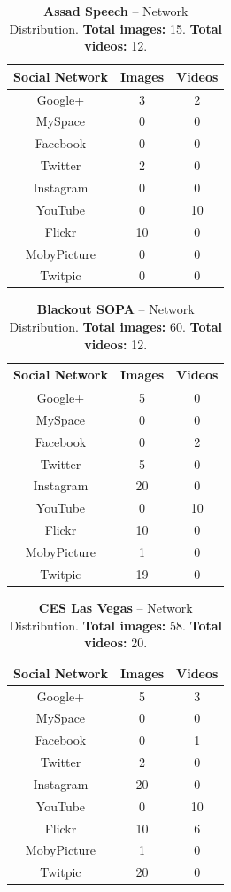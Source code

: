 \documentclass{acm_proc_article-sp}
\begin{document}
\begin{table}[htbp]
  \begin{tabular}{ | c | c | c | }
    \hline
    \textbf{Social Network} & \textbf{Images} & \textbf{Videos}\\
    \hline
    Google+ & 3 & 2\\
    MySpace & 0 & 0\\
    Facebook & 0 & 0\\
    Twitter & 2 & 0\\
    Instagram & 0 & 0\\
    YouTube & 0 & 10\\
    Flickr & 10 & 0\\
    MobyPicture & 0 & 0\\
    Twitpic & 0 & 0\\
    \hline
  \end{tabular}
  \label{tab:assad}
  \caption{\textbf{Assad Speech} -- Network Distribution. \textbf{Total images:} 15. \textbf{Total videos:} 12.}
\end{table}

\begin{table}[htbp]
  \begin{tabular}{ | c | c | c | }
    \hline
    \textbf{Social Network} & \textbf{Images} & \textbf{Videos}\\
    \hline
    Google+ & 5 & 0\\
    MySpace & 0 & 0\\
    Facebook & 0 & 2\\
    Twitter & 5 & 0\\
    Instagram & 20 & 0\\
    YouTube & 0 & 10\\
    Flickr & 10 & 0\\
    MobyPicture & 1 & 0\\
    Twitpic & 19 & 0\\
    \hline
  \end{tabular}
  \label{tab:sopa}
  \caption{\textbf{Blackout SOPA} -- Network Distribution. \textbf{Total images:} 60. \textbf{Total videos:} 12.}
\end{table}

\begin{table}[htbp]
  \begin{tabular}{ | c | c | c | }
    \hline
    \textbf{Social Network} & \textbf{Images} & \textbf{Videos}\\
    \hline
    Google+ & 5 & 3\\
    MySpace & 0 & 0\\
    Facebook & 0 & 1\\
    Twitter & 2 & 0\\
    Instagram & 20 & 0\\
    YouTube & 0 & 10\\
    Flickr & 10 & 6\\
    MobyPicture & 1 & 0\\
    Twitpic & 20 & 0\\
    \hline
  \end{tabular}
  \label{tab:ces}
  \caption{\textbf{CES Las Vegas} -- Network Distribution. \textbf{Total images:} 58. \textbf{Total videos:} 20.}
\end{table}
\end{document}
